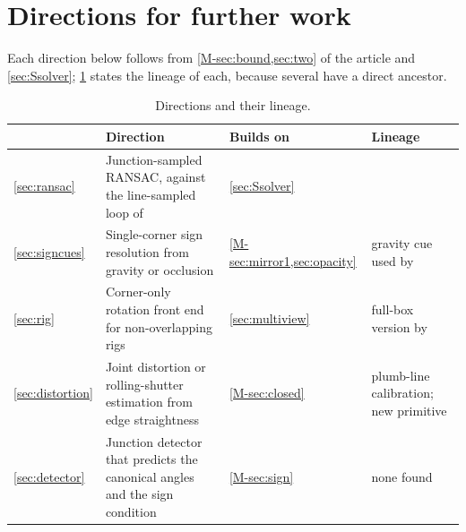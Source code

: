 \section{Directions for further work}\label{sec:directions}
Each direction below follows from \cref{M-sec:bound,sec:two} of the article and \cref{sec:Ssolver}; \cref{tab:proposals} states the lineage of each, because several have a direct ancestor.

\begin{table}[t]
\centering\small
\caption{Directions and their lineage.}
\label{tab:proposals}
\begin{tabularx}{\linewidth}{l >{\raggedright\arraybackslash}X l >{\raggedright\arraybackslash}X}
\toprule
& Direction & Builds on & Lineage \\
\midrule
\ref{sec:ransac} & Junction-sampled RANSAC, against the line-sampled loop of \citet{wildenauer2012} & \cref{sec:Ssolver} & \citet{wildenauer2012} \\
\ref{sec:signcues} & Single-corner sign resolution from gravity or occlusion & \cref{M-sec:mirror1,sec:opacity} & gravity cue used by \citet{shakunaga1989} \\
\ref{sec:rig} & Corner-only rotation front end for non-overlapping rigs & \cref{sec:multiview} & full-box version by \citet{wilczkowiak2005} \\
\ref{sec:distortion} & Joint distortion or rolling-shutter estimation from edge straightness & \cref{M-sec:closed} & plumb-line calibration; new primitive \\
\ref{sec:detector} & Junction detector that predicts the canonical angles and the sign condition & \cref{M-sec:sign} & none found \\
\bottomrule
\end{tabularx}
\end{table}


